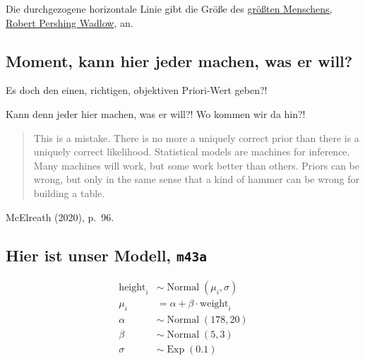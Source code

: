 \documentclass[
  a4paper,
  DIV=11]{scrreprt}
\theoremstyle{definition}
\theoremstyle{remark}
\begin{document}
Die durchgezogene horizontale Linie gibt die Größe des
\href{https://en.wikipedia.org/wiki/Robert_Wadlow}{größten Menschens,
Robert Pershing Wadlow}, an.

\hypertarget{moment-kann-hier-jeder-machen-was-er-will}{%
\subsection{Moment, kann hier jeder machen, was er
will?}\label{moment-kann-hier-jeder-machen-was-er-will}}

Es doch den einen, richtigen, objektiven Priori-Wert geben?!

Kann denn jeder hier machen, was er will?! Wo kommen wir da hin?!

\begin{quote}
This is a mistake. There is no more a uniquely correct prior than there
is a uniquely correct likelihood. Statistical models are machines for
inference. Many machines will work, but some work better than others.
Priors can be wrong, but only in the same sense that a kind of hammer
can be wrong for building a table.
\end{quote}

McElreath (2020), p.~96.

\hypertarget{hier-ist-unser-modell-m43a}{%
\subsection{\texorpdfstring{Hier ist unser Modell,
\texttt{m43a}}{Hier ist unser Modell, m43a}}\label{hier-ist-unser-modell-m43a}}

\begin{align}
\text{height}_i &\sim \operatorname{Normal}(\mu_i, \sigma) \\
\mu_i &= \alpha + \beta \cdot  \text{weight}_i\\
\alpha &\sim \operatorname{Normal}(178, 20)\\
\beta &\sim \operatorname{Normal}(5,3)\\
\sigma &\sim \operatorname{Exp}(0.1)
\end{align}
\end{document}
